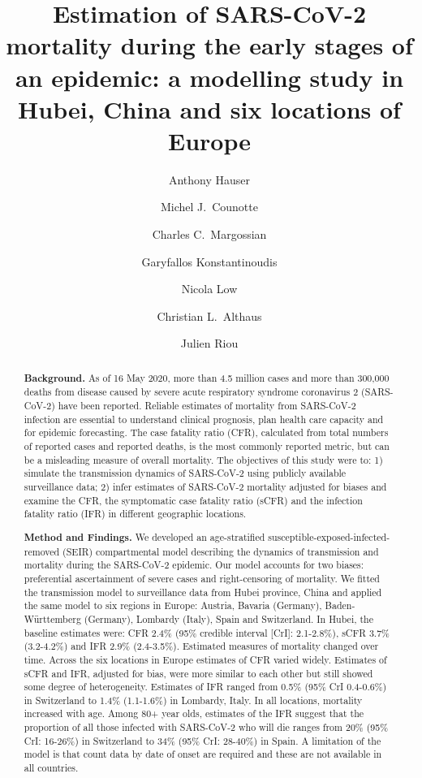 \documentclass{article}
\title{Estimation of SARS-CoV-2 mortality during the early stages of an epidemic: a modelling study in Hubei, China and six locations of Europe}
\author[a]{Anthony Hauser}
\author[a]{Michel J.~Counotte}
\author[b]{Charles C.~Margossian}
\author[c]{Garyfallos Konstantinoudis}
\author[a]{Nicola Low}
\author[a]{Christian L.~Althaus}
\author[a,*]{Julien Riou}
\affil[a]{{\small Institute of Social and Preventive Medicine, University of Bern, Bern, Switzerland}}
\affil[b]{{\small Department of Statistics, Columbia University, New York, NY}}
\affil[c]{{\small MRC Centre for Environment and Health, Department of Epidemiology and Biostatistics, School of Public Health, Imperial College London, London, UK}}
\affil[*] {{\small Corresponding  author (\texttt{julien.riou@ispm.unibe.ch})}}
\begin{document}
\maketitle

\begin{abstract}
\textbf{Background.} As of 16 May 2020, more than 4.5 million cases and more than 300,000 deaths from disease caused by severe acute respiratory syndrome coronavirus 2 (SARS-CoV-2) have been reported. Reliable estimates of mortality from SARS-CoV-2 infection are essential to understand clinical prognosis, plan health care capacity and for epidemic forecasting. The case fatality ratio (CFR), calculated from total numbers of reported cases and reported deaths, is the most commonly reported metric, but can be a misleading measure of overall mortality. The objectives of this study were to: 1) simulate the transmission dynamics of SARS-CoV-2 using publicly available surveillance data; 2) infer estimates of SARS-CoV-2 mortality adjusted for biases and examine the CFR, the symptomatic case fatality ratio (sCFR) and the infection fatality ratio (IFR) in different geographic locations.


\textbf{Method and Findings.} We developed an age-stratified susceptible-exposed-infected-removed (SEIR) compartmental model describing the dynamics of transmission and mortality during the SARS-CoV-2 epidemic. Our model accounts for two biases: preferential ascertainment of severe cases and right-censoring of mortality. We fitted the transmission model to surveillance data from Hubei province, China and applied the same model to six regions in Europe: Austria, Bavaria (Germany), Baden-Württemberg (Germany), Lombardy (Italy), Spain and Switzerland. In Hubei, the baseline estimates were: CFR 2.4\% (95\% credible interval [CrI]: 2.1-2.8\%), sCFR 3.7\% (3.2-4.2\%) and IFR 2.9\% (2.4-3.5\%). Estimated measures of mortality changed over time. Across the six locations in Europe estimates of CFR varied widely. Estimates of sCFR and IFR, adjusted for bias, were more similar to each other but still showed some degree of heterogeneity. Estimates of IFR ranged from 0.5\% (95\% CrI 0.4-0.6\%) in Switzerland to 1.4\% (1.1-1.6\%) in Lombardy, Italy. In all locations, mortality increased with age. Among 80+ year olds, estimates of the IFR suggest that the proportion of all those infected with SARS-CoV-2 who will die ranges from 20\% (95\% CrI: 16-26\%) in Switzerland to 34\% (95\% CrI: 28-40\%) in Spain. A limitation of the model is that count data by date of onset are required and these are not available in all countries.


\end{abstract}
\end{document}
